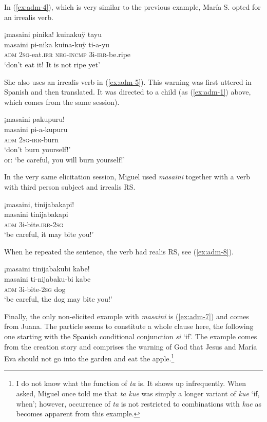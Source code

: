 In (\ref{ex:adm-4}), which is very similar to the previous example, María S. opted for an irrealis verb.

\ea\label{ex:adm-4}
\begingl
\glpreamble ¡masaini pinika! kuinakuÿ tayu\\
\gla masaini pi-nika kuina-kuÿ ti-a-yu\\
\glb \textsc{adm} 2\textsc{sg}-eat.\textsc{irr} \textsc{neg}-\textsc{incmp} 3i-\textsc{irr}-be.ripe\\
\glft ‘don’t eat it! It is not ripe yet’
\endgl
\trailingcitation{[rxx-e181022le]}
\xe

She also uses an irrealis verb in (\ref{ex:adm-5}). This warning was first uttered in Spanish and then translated. It was directed to a child (as (\ref{ex:adm-1}) above, which comes from the same session).

\ea\label{ex:adm-5}
\begingl
\glpreamble ¡masaini pakupuru!\\
\gla masaini pi-a-kupuru\\
\glb \textsc{adm} 2\textsc{sg}-\textsc{irr}-burn\\
\glft ‘don’t burn yourself!’\\or: ‘be careful, you will burn yourself!’
\endgl
\trailingcitation{[mrx-e150219s.147]}
\xe

In the very same elicitation session, Miguel used \textit{masaini} together with a verb with third person subject and irrealis RS.

\ea\label{ex:adm-6}
\begingl
\glpreamble ¡masaini, tinijabakapi!\\
\gla masaini tinijabakapi\\
\glb \textsc{adm} 3i-bite.\textsc{irr}-2\textsc{sg}\\
\glft ‘be careful, it may bite you!’
\endgl
\trailingcitation{[mrx-e150219s.148]}
\xe

When he repeated the sentence, the verb had realis RS, see (\ref{ex:adm-8}).

\ea\label{ex:adm-8}
\begingl
\glpreamble ¡masaini tinijabakubi kabe!\\
\gla masaini ti-nijabaku-bi kabe\\
\glb \textsc{adm} 3i-bite-2\textsc{sg} dog\\
\glft ‘be careful, the dog may bite you!’
\endgl
\trailingcitation{[mrx-e150219s.149]}
\xe
{}

Finally, the only non-elicited example with \textit{masaini} is (\ref{ex:adm-7}) and comes from Juana. The particle seems to constitute a whole clause here, the following one starting with the Spanish conditional conjunction \textit{si} ‘if’. The example comes from the creation story and comprises the warning of God that Jesus and María Eva should not go into the garden and eat the apple.\footnote{I do not know what the function of \textit{ta} is. It shows up infrequently. When asked, Miguel once told me that \textit{ta kue} was simply a longer variant of \textit{kue} ‘if, when’; however, occurrence of \textit{ta} is not restricted to combinations with \textit{kue} as becomes apparent from this example.}

